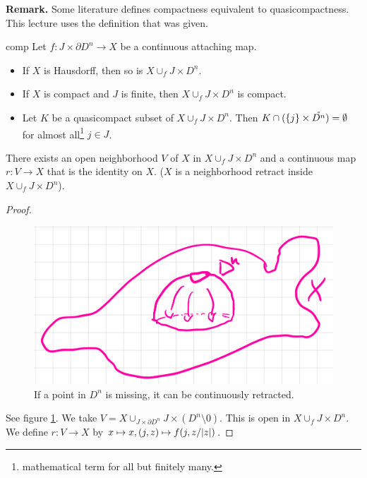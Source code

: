 \documentclass{TemplateLecture}
\begin{document}
\textbf{Remark.} Some literature defines compactness equivalent to quasicompactness. This lecture uses the definition that was given.

\begin{thm}{}{comp}
    Let \(f\colon J \times \partial D^n \to X\) be a continuous attaching map.
    \begin{itemize}
        \item If \(X\) is Hausdorff, then so is \(X \cup_f J\times D^n\).
        \item If \(X\) is compact and \(J\) is finite, then \(X \cup_f J\times D^n\) is compact.
        \item Let \(K\) be a quasicompact subset of \(X\cup_f J\times D^n.\) Then \(K\cap (\{j\} \times \mathring{D^n}) = \emptyset\) for almost all\footnote{mathematical term for all but finitely many.} \(j \in J\).
    \end{itemize}
\end{thm}

\begin{lem}{}{}
    There exists an open neighborhood \(V\) of \(X\) in \(X\cup_f J\times D^n\) and a continuous map \(r\colon V\to X\) that is the identity on \(X\). (\(X\) is a neighborhood retract inside \(X \cup_f J\times D^n\)).
\end{lem}

\begin{proof}
    \begin{figure}
        \centering
        \includegraphics[width=0.8\linewidth]{pic/exRt.png}
        \caption{If a point in \(D^n\) is missing, it can be continuously retracted.}
        \label{fig:exRt}
    \end{figure}
    See figure \ref{fig:exRt}. We take
    \(V = X\cup_{J\times \partial D^n} J\times (D^n\setminus {0})\). This is open in \(X \cup_f J\times D^n\). We define \(r \colon V\to X\) by \(x\mapsto x, (j,z) \mapsto f(j, z/\lvert z\rvert)\).
\end{proof}
\end{document}
